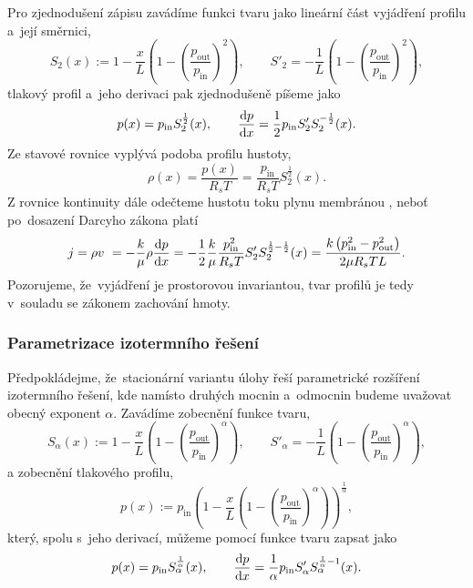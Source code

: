 Pro zjednodušení zápisu zavádíme funkci tvaru jako lineární část vyjádření profilu a~její směrnici,
\begin{equation}
        S_2(x):=1-\frac{x}{L}\left(1-\left(\frac{p_{\mathrm{out}}}{p_{\mathrm{in}}}\right)^2\right), \qquad
        S'_2=-\frac{1}{L}\left(1-\left(\frac{p_{\mathrm{out}}}{p_{\mathrm{in}}}\right)^2\right),
\end{equation}
tlakový profil a~jeho derivaci pak zjednodušeně píšeme jako
\begin{equation}
    p(x)=p_{\mathrm{in}}S_2^{\frac{1}{2}}(x), \qquad \frac{\mathrm{d} p}{\mathrm{d} x}=\frac{1}{2}p_{\mathrm{in}}S'_2S_2^{-\frac{1}{2}}(x).
\end{equation}
Ze stavové rovnice vyplývá podoba profilu hustoty,
\begin{equation}
    \rho(x)=\frac{p(x)}{R_s T}=\frac{p_{\mathrm{in}}}{R_s T}S_2^{\frac{1}{2}}(x).
\end{equation}
Z rovnice kontinuity dále odečteme hustotu toku plynu membránou , neboť po~dosazení Darcyho zákona platí
\begin{equation}
    j=\rho v~= -\frac{k}{\mu}\rho \frac{\mathrm{d} p}{\mathrm{d} x}
    =-\frac{1}{2}\frac{k}{\mu}\frac{p_{\mathrm{in}}^2}{R_s T}S'_2S_2^{\frac{1}{2}-\frac{1}{2}}(x)
    =\frac{k\left(p_{\mathrm{in}}^2-p_{\mathrm{out}}^2\right)}{2\mu R_s TL}.
\end{equation}
Pozorujeme, že~vyjádření je prostorovou invariantou, tvar profilů je tedy v~souladu se zákonem zachování hmoty.


\subsubsection{Parametrizace izotermního řešení}\label{sss:parametrizace_izotermniho_reseni}
Předpokládejme, že~stacionární variantu úlohy  řeší parametrické rozšíření izotermního řešení, kde namísto druhých mocnin a~odmocnin budeme uvažovat obecný exponent $\alpha$. Zavádíme zobecnění funkce tvaru,
\begin{equation}
    S_\alpha(x):=1-\frac{x}{L}\left(1-\left(\frac{p_{\mathrm{out}}}{p_{\mathrm{in}}}\right)^\alpha\right),\qquad
    S'_\alpha=-\frac{1}{L}\left(1-\left(\frac{p_{\mathrm{out}}}{p_{\mathrm{in}}}\right)^\alpha\right),
\end{equation}
a zobecnění tlakového profilu,
\begin{equation}\label{eq:pressure_profile_general}
    p(x):=p_{\mathrm{in}}\left(1-\frac{x}{L}\left(1-\left(\frac{p_{\mathrm{out}}}{p_{\mathrm{in}}}\right)^\alpha\right)\right)^{\frac{1}{\alpha}},
\end{equation}
který, spolu s~jeho derivací, můžeme pomocí funkce tvaru zapsat jako
\begin{equation}
    p(x)=p_{\mathrm{in}}S_\alpha^{\frac{1}{\alpha}}(x),\qquad \frac{\mathrm{d} p}{\mathrm{d} x}=\frac{1}{\alpha}p_{\mathrm{in}}S'_\alpha S_\alpha^{\frac{1}{\alpha}-1}(x).
\end{equation}

